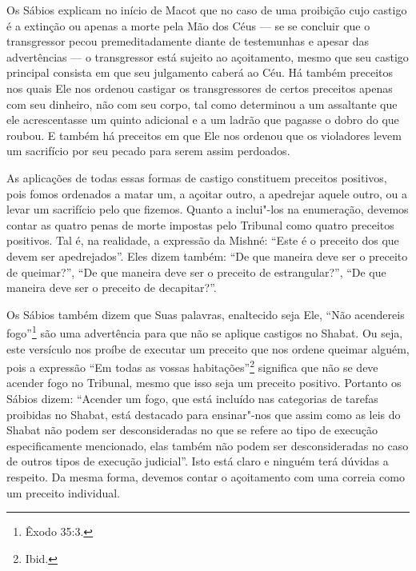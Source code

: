Os Sábios explicam no início de Macot\starr{} que no caso de uma proibição cujo
castigo é a extinção ou apenas a morte pela Mão dos Céus --- se se
concluir que o transgressor pecou premeditadamente diante de testemunhas
e apesar das advertências --- o transgressor está sujeito ao
açoitamento, mesmo que seu castigo principal consista em que seu
julgamento caberá ao Céu. Há também preceitos nos quais Ele nos ordenou
castigar os transgressores de certos preceitos apenas com seu dinheiro,
não com seu corpo, tal como determinou a um assaltante que ele acrescentasse um quinto adicional e a um
ladrão que pagasse o dobro do que roubou. E também há preceitos em que
Ele nos ordenou que os violadores levem um sacrifício por seu pecado
para serem assim perdoados.

As aplicações de todas essas formas de castigo constituem preceitos
positivos, pois fomos ordenados a matar um, a açoitar outro, a apedrejar
aquele outro, ou a levar um sacrifício pelo que fizemos. Quanto a
inclui"-los na enumeração, devemos contar as quatro penas de morte
impostas pelo Tribunal como quatro preceitos positivos. Tal é, na
realidade, a expressão da Mishné: ``Este é o preceito dos que devem ser
apedrejados''. Eles dizem também: ``De que maneira deve ser o preceito
de queimar?'', ``De que maneira deve ser o preceito de estrangular?'',
``De que maneira deve ser o preceito de decapitar?''.

Os Sábios também dizem que Suas palavras, enaltecido seja Ele, ``Não
acendereis fogo''\footnote{Êxodo 35:3.} são uma advertência para que não se
aplique castigos no Shabat. Ou seja, este versículo nos proíbe de
executar um preceito que nos ordene queimar alguém, pois a expressão
``Em todas as vossas habitações''\footnote{Ibid.} significa que não se deve
acender fogo no Tribunal, mesmo que isso seja um preceito positivo.
Portanto os Sábios dizem: ``Acender um fogo, que está incluído nas
categorias de tarefas proibidas no Shabat, está destacado para
ensinar"-nos que assim como as leis do Shabat não podem ser
desconsideradas no que se refere ao tipo de execução especificamente
mencionado, elas também não podem ser desconsideradas no caso de outros
tipos de execução judicial''. Isto está claro e ninguém terá dúvidas a
respeito. Da mesma forma, devemos contar o açoitamento com uma correia
como um preceito individual.

